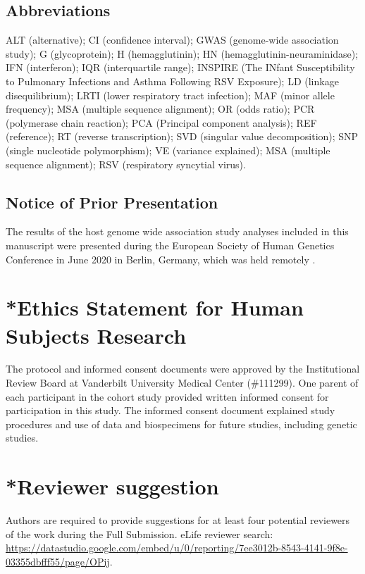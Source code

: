 \documentclass{article} %
\makeatletter
\renewcommand{\maketitle}{\bgroup\setlength{\parindent}{0pt}
\begin{flushleft}
  \textbf{\@title}

  \@author
\end{flushleft}\egroup
}
\makeatother
\begin{document}
\maketitle


\subsection*{Abbreviations}
ALT (alternative); CI (confidence interval); GWAS (genome-wide association study); G (glycoprotein); H (hemagglutinin); HN (hemagglutinin-neuraminidase); IFN (interferon); IQR (interquartile range); INSPIRE (The INfant Susceptibility to Pulmonary Infections and Asthma Following RSV Exposure); LD (linkage disequilibrium); LRTI (lower respiratory tract infection); MAF (minor allele frequency); MSA (multiple sequence alignment); OR (odds ratio); PCR (polymerase chain reaction); PCA (Principal component analysis); REF (reference); RT (reverse transcription); SVD (singular value decomposition); SNP (single nucleotide polymorphism); VE (variance explained); MSA (multiple sequence alignment); RSV (respiratory syncytial virus).

\subsection*{Notice of Prior Presentation}
The results of the host genome wide association study analyses included in this manuscript were presented during the European Society of Human Genetics Conference in June 2020 in Berlin, Germany, which was held remotely 
\citep{lawless2020genome}.

\section*{*Ethics Statement for Human Subjects Research}
The protocol and informed consent documents were approved by the Institutional Review Board at Vanderbilt University Medical Center (\#111299). One parent of each participant in the cohort study provided written informed consent for participation in this study. The informed consent document explained study procedures and use of data and biospecimens for future studies, including genetic studies.

\section*{*Reviewer suggestion}
Authors are required to provide suggestions for at least four potential reviewers of the work during the Full Submission. eLife reviewer search:
\url{https://datastudio.google.com/embed/u/0/reporting/7ee3012b-8543-4141-9f8e-03355dbfff55/page/OPij}.
\end{document}
